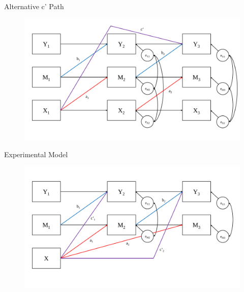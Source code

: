\documentclass{beamer}
\begin{document}
\begin{frame}{Alternative c' Path}

  \begin{figure}
    \includegraphics[width=\textwidth]{figures/threeWaveStructure3.pdf}
  \end{figure}

\end{frame}



\begin{frame}{Experimental Model}

  \begin{figure}
    \includegraphics[width=\textwidth]{figures/threeWaveExpStructure2.pdf}
  \end{figure}

\end{frame}
\end{document}
